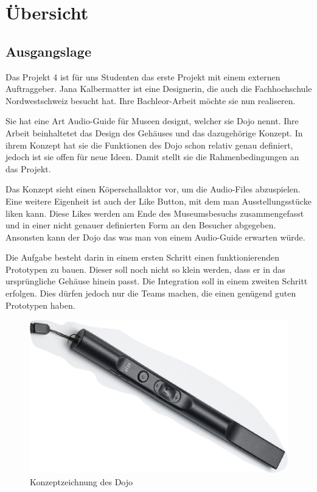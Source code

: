 \section{Übersicht} 

\subsection{Ausgangslage}
Das Projekt 4 ist für uns Studenten das erste Projekt mit einem externen Auftraggeber. Jana Kalbermatter ist eine Designerin, die auch die Fachhochschule Nordwestschweiz besucht hat. Ihre Bachleor-Arbeit möchte sie nun realiseren.

Sie hat eine Art Audio-Guide für Museen designt, welcher sie Dojo nennt. Ihre Arbeit beinhaltetet das Design des Gehäuses und das dazugehörige Konzept. In ihrem Konzept hat sie die Funktionen des Dojo schon relativ genau definiert, jedoch ist sie offen für neue Ideen. Damit stellt sie die Rahmenbedingungen an das Projekt.

Das Konzept sieht einen Köperschallaktor vor, um die Audio-Files abzuspielen. Eine weitere Eigenheit ist auch der Like Button, mit dem man Ausstellungsstücke \glqq liken \grqq kann. Diese Likes werden am Ende des Museumsbesuchs zusammengefasst und in einer nicht genauer definierten Form an den Besucher abgegeben. Ansonsten kann der Dojo das was man von einem Audio-Guide erwarten würde.

Die Aufgabe besteht darin in einem ersten Schritt einen funktionierenden Prototypen zu bauen. Dieser soll noch nicht so klein werden, dass er in das ursprüngliche Gehäuse hinein passt. Die Integration soll in einem zweiten Schritt erfolgen. Dies dürfen jedoch nur die Teams machen, die einen genügend guten Prototypen haben.

\begin{figure}[H]
\begin{center}
	\includegraphics[width=160mm]{data/Ausgangslage_Dojo.png}
	\caption{Konzeptzeichnung des Dojo} %
	\label{fig:ausgangslage}
\end{center}
\end{figure}

